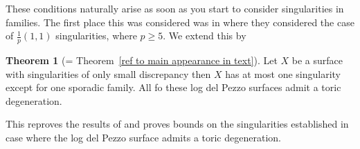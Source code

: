 \documentclass[12pt]{amsart}
\theoremstyle{definition}
\newtheorem{thm}{Theorem}[section]
\theoremstyle{definition}
\theoremstyle{definition}
\theoremstyle{definition}
\theoremstyle{definition}
\theoremstyle{definition}
\theoremstyle{definition}
\theoremstyle{definition}
\begin{document}
These conditions naturally arise as soon as you start to consider singularities in families. The first place this was considered was in \cite{CP} where they considered the case of $\frac{1}{p}(1,1)$ singularities, where $p \geq 5$. We extend this by


\begin{thm}[= Theorem~\ref{ref to main appearance in text}]
Let $X$ be a surface with singularities of only small discrepancy then $X$ has at most one singularity except for one sporadic family. All fo these log del Pezzo surfaces admit a toric degeneration.
\end{thm}

This reproves the results of \cite{CP} and proves bounds on the singularities established in \cite{CH} case where the log del Pezzo surface admits a toric degeneration.
\end{document}
